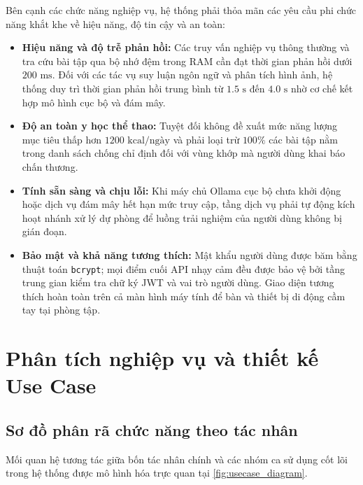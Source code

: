 Bên cạnh các chức năng nghiệp vụ, hệ thống phải thỏa mãn các yêu cầu phi chức năng khắt khe về hiệu năng, độ tin cậy và an toàn:
\begin{itemize}[leftmargin=1.5cm]
    \item \textbf{Hiệu năng và độ trễ phản hồi:} Các truy vấn nghiệp vụ thông thường và tra cứu bài tập qua bộ nhớ đệm trong RAM cần đạt thời gian phản hồi dưới $200\text{ ms}$. Đối với các tác vụ suy luận ngôn ngữ và phân tích hình ảnh, hệ thống duy trì thời gian phản hồi trung bình từ $1.5\text{ s}$ đến $4.0\text{ s}$ nhờ cơ chế kết hợp mô hình cục bộ và đám mây.
    \item \textbf{Độ an toàn y học thể thao:} Tuyệt đối không đề xuất mức năng lượng mục tiêu thấp hơn $1200\text{ kcal/ngày}$ và phải loại trừ $100\%$ các bài tập nằm trong danh sách chống chỉ định đối với vùng khớp mà người dùng khai báo chấn thương.
    \item \textbf{Tính sẵn sàng và chịu lỗi:} Khi máy chủ Ollama cục bộ chưa khởi động hoặc dịch vụ đám mây hết hạn mức truy cập, tầng dịch vụ phải tự động kích hoạt nhánh xử lý dự phòng để luồng trải nghiệm của người dùng không bị gián đoạn.
    \item \textbf{Bảo mật và khả năng tương thích:} Mật khẩu người dùng được băm bằng thuật toán \texttt{bcrypt}; mọi điểm cuối API nhạy cảm đều được bảo vệ bởi tầng trung gian kiểm tra chữ ký JWT và vai trò người dùng. Giao diện tương thích hoàn toàn trên cả màn hình máy tính để bàn và thiết bị di động cầm tay tại phòng tập.
\end{itemize}

\section{Phân tích nghiệp vụ và thiết kế Use Case}
\label{sec:usecase}

\subsection{Sơ đồ phân rã chức năng theo tác nhân}
\label{subsec:usecase_tongquat}

Mối quan hệ tương tác giữa bốn tác nhân chính và các nhóm ca sử dụng cốt lõi trong hệ thống được mô hình hóa trực quan tại \cref{fig:usecase_diagram}.

